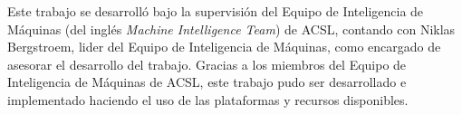 Este trabajo se desarrolló bajo la supervisión del Equipo de Inteligencia de Máquinas (del inglés \textit{Machine Intelligence Team}) de ACSL, contando con Niklas Bergstroem, lider del Equipo de Inteligencia de Máquinas, como encargado de asesorar el desarrollo del trabajo. Gracias a los miembros del Equipo de Inteligencia de Máquinas de ACSL, este trabajo pudo ser desarrollado e implementado haciendo el uso de las plataformas y recursos disponibles.
